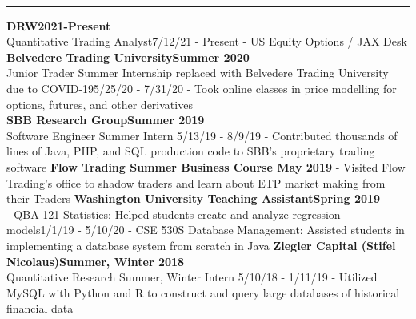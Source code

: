 \documentclass[11pt]{article}
\begin{document}
\begin{titlepage}
\begin{addmargin}[1em]{0em}
\begin{center}
\begin{minipage}[b]{0.3\textwidth}
				\end{minipage}
			\end{center}
		\end{addmargin}
		\vspace{-10pt}
		\noindent
		\\\rule{\textwidth}{0.4pt}
		\begin{addmargin}[1em]{0em}
			\textbf{DRW\hfill 2021-Present}\\
				Quantitative Trading Analyst\hfill {\small{7/12/21 - Present}}\newline
				- US Equity Options / JAX Desk\\
		    \textbf{Belvedere Trading University\hfill Summer 2020}\\
				Junior Trader Summer Internship replaced with Belvedere Trading University due to COVID-19\hfill {\small{5/25/20 - 7/31/20}}\newline
				- Took online classes in price modelling for options, futures, and other derivatives\\
    		\textbf{SBB Research Group\hfill Summer 2019}\\
				Software Engineer Summer Intern \hfill {\small{5/13/19 - 8/9/19}}\newline
				- Contributed thousands of lines of Java, PHP, and SQL production code to SBB's proprietary trading software\newline
            \textbf{Flow Trading Summer Business Course \hfill May 2019}\newline
				- Visited Flow Trading's office to shadow traders and learn about ETP market making from their Traders\newline
		    \textbf{Washington University Teaching Assistant\hfill Spring 2019}\\
				- QBA 121 Statistics: Helped students create and analyze regression models\hfill {\small{1/1/19 - 5/10/20}}\newline
				- CSE 530S Database Management: Assisted students in implementing a database system from scratch in Java\newline
			\textbf{Ziegler Capital (Stifel Nicolaus)\hfill Summer, Winter 2018}\\
				Quantitative Research Summer, Winter Intern \hfill {\small{5/10/18 - 1/11/19}}\newline
				- Utilized MySQL with Python and R to construct and query large databases of historical financial data \newline

\end{addmargin}
\end{titlepage}
\end{document}
